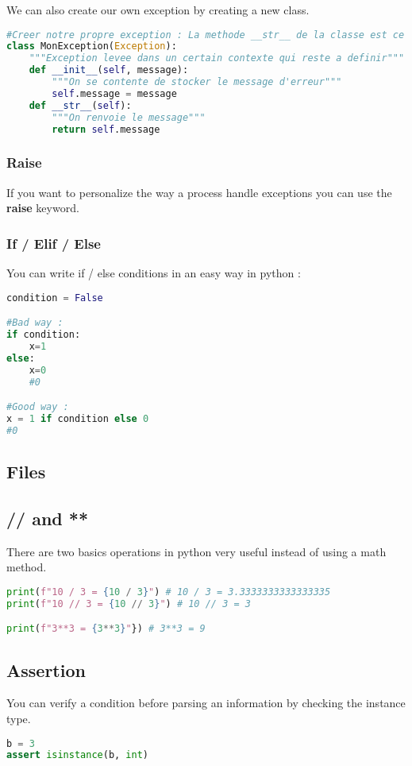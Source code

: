 \documentclass[a4paper, 12pt]{article}
\begin{document}
We can also create our own exception by creating a new class.
\begin{lstlisting}[language=Python]
#Creer notre propre exception : La methode __str__ de la classe est ce qui est appele pour afficher le message d'erreur
class MonException(Exception):
    """Exception levee dans un certain contexte qui reste a definir"""
    def __init__(self, message):
        """On se contente de stocker le message d'erreur"""
        self.message = message
    def __str__(self):
        """On renvoie le message"""
        return self.message
\end{lstlisting}

\subsubsection{Raise}
\label{Raise}
If you want to personalize the way a process handle exceptions you can use the \textbf{raise} keyword.


\subsubsection{If / Elif / Else}
\label{IEE}
You can write if / else conditions in an easy way in python :
\begin{lstlisting}[language=Python]
condition = False

#Bad way :
if condition:
	x=1
else:
	x=0
	#0

#Good way :
x = 1 if condition else 0
#0
\end{lstlisting}

\subsection{Files}

\subsection{// and **}
There are two basics operations in python very useful instead of using a math method.
\begin{lstlisting}[language=Python]
print(f"10 / 3 = {10 / 3}") # 10 / 3 = 3.3333333333333335
print(f"10 // 3 = {10 // 3}") # 10 // 3 = 3

print(f"3**3 = {3**3}"}) # 3**3 = 9
\end{lstlisting}

\subsection{Assertion}
\label{subsec:Assertion}
You can verify a condition before parsing an information by checking the instance type.
\begin{lstlisting}[language=Python]
b = 3
assert isinstance(b, int)
\end{lstlisting}
\end{document}
